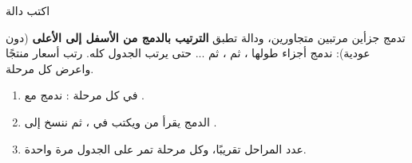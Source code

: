 \begin{statement}
اكتب دالة \par{\centering\small{}\par} تدمج جزأين مرتبين متجاورين، ودالة  تطبق \textbf{الترتيب بالدمج من الأسفل إلى الأعلى} (دون عودية): ندمج أجزاء طولها ، ثم ، ثم ... حتى يرتب الجدول كله. رتب أسعار  منتجًا واعرض كل مرحلة.
\end{statement}
\begin{stepsbox}\begin{enumerate}
\item في كل مرحلة : ندمج \code{[left, left+width)} مع \code{[left+width, left+2*width)}.
\item الدمج يقرأ من  ويكتب في ، ثم ننسخ  إلى .
\item عدد المراحل  تقريبًا، وكل مرحلة تمر على الجدول مرة واحدة.
\end{enumerate}\end{stepsbox}
